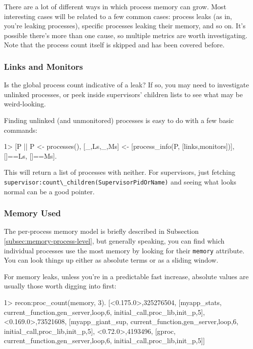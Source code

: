 \documentclass[11pt, oneside]{book}   	%
\newcommand{\expression}[1]{\Verb`#1`}
\newcommand{\term}[1]{\Verb`#1`}
\begin{document}
There are a lot of different ways in which process memory can grow. Most interesting cases will be related to a few common cases: process leaks (as in, you're leaking processes), specific processes leaking their memory, and so on. It's possible there's more than one cause, so multiple metrics are worth investigating. Note that the process count itself is skipped and has been covered before.

\subsubsection{Links and Monitors}

Is the global process count indicative of a leak? If so, you may need to investigate unlinked processes, or peek inside supervisors' children lists to see what may be weird-looking.

Finding unlinked (and unmonitored) processes is easy to do with a few basic commands:

\begin{VerbatimEshell}
1> [P || P <- processes(),
         [{_,Ls},{_,Ms}] <- [process_info(P, [links,monitors])],
         []==Ls, []==Ms].
\end{VerbatimEshell}

This will return a list of processes with neither. For supervisors, just fetching \newline \expression{supervisor:count\_children(SupervisorPidOrName)} and seeing what looks normal can be a good pointer.


\subsubsection{Memory Used}

The per-process memory model is briefly described in Subsection \ref{subsec:memory-process-level}, but generally speaking, you can find which individual processes use the most memory by looking for their \term{memory} attribute. You can look things up either as absolute terms or as a sliding window.

For memory leaks, unless you're in a predictable fast increase, absolute values are usually those worth digging into first:

\begin{VerbatimEshell}
1> recon:proc_count(memory, 3).
[{<0.175.0>,325276504,
  [myapp_stats,
   {current_function,{gen_server,loop,6}},
   {initial_call,{proc_lib,init_p,5}}]},
 {<0.169.0>,73521608,
  [myapp_giant_sup,
   {current_function,{gen_server,loop,6}},
   {initial_call,{proc_lib,init_p,5}}]},
 {<0.72.0>,4193496,
  [gproc,
   {current_function,{gen_server,loop,6}},
   {initial_call,{proc_lib,init_p,5}}]}]
\end{VerbatimEshell}
\end{document}
